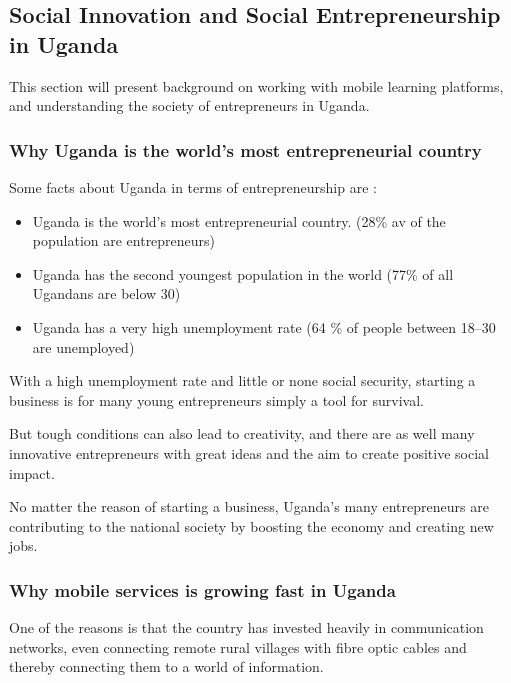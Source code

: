 \subsection{Social Innovation and Social Entrepreneurship in Uganda} %

    This section will present background on working with mobile learning platforms, and understanding the society of entrepreneurs in Uganda.

    \subsubsection{Why Uganda is the world's most entrepreneurial country}
    Some facts about Uganda in terms of entrepreneurship are \cite{nissar}:

    \begin{itemize}
      \item Uganda is the world's most entrepreneurial country. (28\% av of the population are entrepreneurs)
        \item Uganda has the second youngest population in the world (77\% of all Ugandans are below 30)
        \item Uganda has a very high unemployment rate (64 \% of people between 18–30 are unemployed)
    \end{itemize}


    With a high unemployment rate and little or none social security, starting a business is for many young entrepreneurs simply a tool for survival.

    But tough conditions can also lead to creativity, and there are as well many innovative entrepreneurs with great ideas and the aim to create positive social impact.

    No matter the reason of starting a business, Uganda's many entrepreneurs are contributing to the national society by boosting the economy and creating new jobs.

    \subsubsection{Why mobile services is growing fast in Uganda}
    One of the reasons is that the country has invested heavily in communication networks, even connecting remote rural villages with fibre optic cables and thereby connecting them to a world of information.

